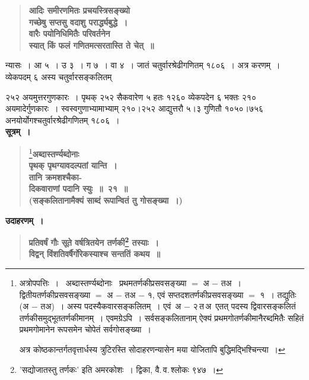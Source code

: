 \documentclass[11pt, openany]{book}
\begin{document}
 \label{Ex 3.15}
\begin{quote}
\textbf{{\color{red}आदिः समीरणमितः प्रचयस्त्रिसङ्ख्यो \\
गच्छेषु सप्तसु वदाशु परार्द्ध्यबुद्धे~।\\
वारैः पयोनिधिमितैः परिवर्तनेन \\
स्यात् किं फलं गणितमत्सरतास्ति ते चेत्~॥}}
\end{quote}

न्यासः~। आ ५~। उ ३~। ग ७~। वा ४~। जातं चतुर्वारश्रेढीगणितम् १८०६~। अत्र करणम्~। व्येकपदम् ६ अस्य चतुर्वारसङ्कलितम् 

\newpage
\begin{sloppypar}

\noindent २५२ अयमुत्तरगुणकारः~। पृथक् २५२ सैकवारेण ५ हतः १२६० व्येकपदेन ६ भक्तः २१० अयमादेर्गुणकारः~। स्वस्वगुणाभ्यामाभ्याम् २१०।२५२ आद्युत्तरौ ५।३ गुणितौ १०५०।७५६ अनयोर्योगश्चतुर्वारश्रेढीगणितम् १८०६~।\\

\noindent \textbf{सूत्रम्~।}

 \label{3.21}
\begin{quote}
\renewcommand{\thefootnote}{१}\footnote{अत्रोपपत्तिः~।~ अब्दास्तर्ण्यब्दोनाः ~प्रथमतर्णकीप्रसवसङ्ख्या $=$ अ $-$ तअ~।~ द्वितीयतर्णकीप्रसवसङ्ख्या $=$ अ $-$ तअ $-$ १, एवं सप्तदशतर्णकीप्रसवसङ्ख्या $=$ १~। तद्युतिः (अ $-$ तअ)~। अस्य पदस्यैकवारसङ्कलितम्~। एवं\, अ $-$ २\,त\,अ\, एतत् पदस्य द्विवारसङ्कलितं तर्णकीसमुद्भूततर्णकीमानम्~। एवमग्रेऽपि~। सर्वसङ्कलितानाम् ऐक्यं प्रथमगोतर्णकीमानैरब्दमितैः सहितं प्रथमगोमानेन रूपसमेन चोपेतं सर्वगोसङ्ख्या~।
\vspace{1mm}

\hspace{2mm} अत्र कोष्ठकान्तर्गतवृत्तार्धस्य त्रुटिरस्ति सोदाहरणन्यासेन मया योजितापि बुद्धिमद्भिश्चिन्त्या~। \vspace{1mm} }{\large \textbf{{\color{purple}अब्दास्तर्ण्यब्दोनाः \\
पृथक् पृथग्यावदल्पतां यान्ति~।\\
तानि क्रमशश्चैका-\\
दिकवाराणां पदानि स्युः~॥~२१~॥\\
(सङ्कलितानामैक्यं साब्दं रूपान्वितं तु गोसङ्ख्या~।)}}}
\end{quote}

\noindent \textbf{उदाहरणम्~।}

 \label{Ex 3.16}
\begin{quote}
\textbf{{\color{red}प्रतिवर्षं गौः सूते वर्षत्रितयेन तर्णकी\renewcommand{\thefootnote}{२}\footnote{{\color{violet}'सद्योजातस्तु तर्णकः'} इति {\color{violet}अमरकोशः}~। द्विका, वै.\,व.\,श्लोकः ९४७~।} तस्याः~।\\
विद्वन् विंशतिवर्षैर्गोरेकस्याश्च सन्ततिं कथय~॥}}
\end{quote}


\end{sloppypar}
\end{document}
